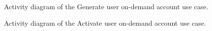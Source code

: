 \documentclass[12pt]{article}
\begin{document}
\begin{figure}[H]
\centering	
{}
\caption{Activity diagram of the Generate user on-demand account use case.}
\end{figure}


\begin{figure}[H]
\centering	
{}
\caption{Activity diagram of the Activate user on-demand account use case.}
\end{figure}
\end{document}
